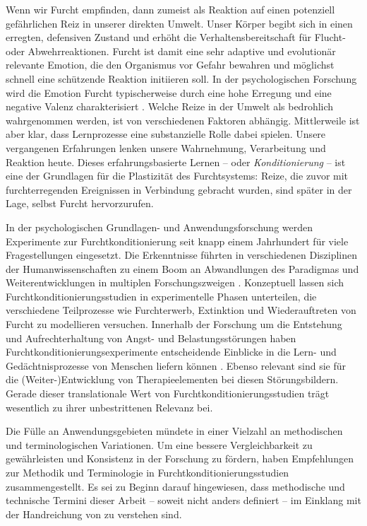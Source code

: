 
	Wenn wir Furcht empfinden, dann zumeist als Reaktion auf einen potenziell gefährlichen Reiz in unserer direkten Umwelt. Unser Körper begibt sich in einen erregten, defensiven Zustand und erhöht die Verhaltensbereitschaft für Flucht- oder Abwehrreaktionen. Furcht ist damit eine sehr adaptive und evolutionär relevante Emotion, die den Organismus vor Gefahr bewahren und möglichst schnell eine schützende Reaktion initiieren soll. In der psychologischen Forschung wird die Emotion Furcht typischerweise durch eine hohe Erregung und eine negative Valenz charakterisiert \parencite{LANG1995}.
	Welche Reize in der Umwelt als bedrohlich wahrgenommen werden, ist von verschiedenen Faktoren abhängig. Mittlerweile ist aber klar, dass Lernprozesse eine substanzielle Rolle dabei spielen. Unsere vergangenen Erfahrungen lenken unsere Wahrnehmung, Verarbeitung und Reaktion heute. Dieses erfahrungsbasierte Lernen -- oder \textit{Konditionierung} -- ist eine der Grundlagen für die Plastizität des Furchtsystems: Reize, die zuvor mit furchterregenden Ereignissen in Verbindung gebracht wurden, sind später in der Lage, selbst Furcht hervorzurufen. 

	In der psychologischen Grundlagen- und Anwendungsforschung werden Experimente zur Furchtkonditionierung seit knapp einem Jahrhundert für viele Fragestellungen eingesetzt. Die  Erkenntnisse führten in verschiedenen Disziplinen der Humanwissenschaften zu einem Boom an Abwandlungen des Paradigmas und Weiterentwicklungen in multiplen Forschungszweigen \parencite{MERZ2020}. Konzeptuell lassen sich Furchtkonditionierungsstudien in experimentelle Phasen unterteilen, die verschiedene Teilprozesse wie Furchterwerb, Extinktion und Wiederauftreten von Furcht zu modellieren versuchen. Innerhalb der Forschung um die Entstehung und Aufrechterhaltung von Angst- und Belastungsstörungen haben Furchtkonditionierungsexperimente entscheidende Einblicke in die Lern- und Gedächtnisprozesse von Menschen liefern können \parencite[für eine Übersichtsarbeit siehe][]{MINEKA2008}. Ebenso relevant sind sie für die (Weiter-)Entwicklung von Therapieelementen bei diesen Störungsbildern. Gerade dieser translationale Wert von Furchtkonditionierungsstudien trägt wesentlich zu ihrer unbestrittenen Relevanz bei.

	Die Fülle an Anwendungsgebieten mündete in einer Vielzahl an methodischen und terminologischen Variationen. Um eine bessere Vergleichbarkeit zu gewährleisten und Konsistenz in der Forschung zu fördern, haben \textcite{LONSDORF2017fc} Empfehlungen zur Methodik und Terminologie in Furchtkonditionierungsstudien zusammengestellt. Es sei zu Beginn darauf hingewiesen, dass methodische und technische Termini dieser Arbeit -- soweit nicht anders definiert -- im Einklang mit der Handreichung von \textcite{LONSDORF2017fc} zu verstehen sind. 

